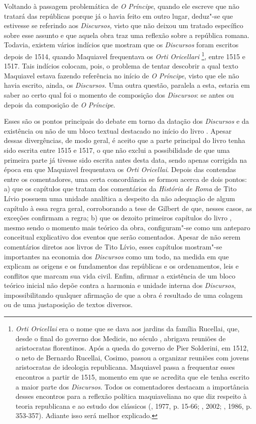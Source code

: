 Voltando à passagem problemática de \emph{O Príncipe}, quando ele
escreve que não tratará das repúblicas porque já o havia feito em outro
lugar, deduz"-se que estivesse se referindo aos \emph{Discursos,} visto
que não deixou um tratado específico sobre esse assunto e que aquela
obra traz uma reflexão sobre a república romana. Todavia, existem vários
indícios que mostram que os \emph{Discursos} foram escritos depois de
1514, quando Maquiavel frequentava os \emph{Orti Oricellari} \footnote{\emph{Orti
  Oricellai} era o nome que se dava aos jardins da família Rucellai,
  que, desde o final do governo dos Medicis, no século , abrigava
  reuniões de aristocratas florentinos. Após a queda do governo de Pier
  Solderini, em 1512, o neto de Bernardo Rucellai, Cosimo, passou a
  organizar reuniões com jovens aristocratas de ideologia republicana.
  Maquiavel passa a frequentar esses encontros a partir de 1515, momento
  em que se acredita que ele tenha escrito a maior parte dos
  \emph{Discursos}. Todos os comentadores destacam a importância desses
  encontros para a reflexão política maquiaveliana no que diz respeito à
  teoria republicana e ao estudo dos clássicos (, 1977, p. 15-66;
  , 2002; , 1986, p. 353-357). Adiante isso será melhor
  explicado.}, entre 1515 e 1517. Tais indícios colocam, pois, o
problema de tentar descobrir a qual texto Maquiavel estava fazendo
referência no início de \emph{O Príncipe}, visto que ele não
havia escrito, ainda, os \emph{Discursos.} Uma outra questão, paralela a
esta, estaria em saber ao certo qual foi o momento de composição dos
\emph{Discursos}: se antes ou depois da composição de \emph{O}
\emph{Príncipe}.

Esses são os pontos principais do debate em torno da datação dos
\emph{Discursos} e da existência ou não de um bloco textual destacado no
início do livro . Apesar dessas divergências, de modo geral, é aceito
que a parte principal do livro tenha sido escrita entre 1515 e 1517, o
que não exclui a possibilidade de que uma primeira parte já tivesse sido
escrita antes desta data, sendo apenas corrigida na época em que
Maquiavel frequentava os \emph{Orti Oricellai}. Depois das contendas
entre os comentadores, uma certa concordância se formou acerca de dois
pontos: a) que os capítulos que tratam dos comentários da \emph{História
de Roma} de Tito Lívio possuem uma unidade analítica a despeito da não
adequação de algum capítulo à essa regra geral, corroborando a tese de
Gilbert de que, nesses casos, as exceções confirmam a regra; b) que os
dezoito primeiros capítulos do livro , mesmo sendo o momento mais
teórico da obra, configuram"-se como um anteparo conceitual explicativo
dos eventos que serão comentados. Apesar de não serem comentários
diretos aos livros de Tito Lívio, esses capítulos mostram"-se importantes
na economia dos \emph{Discursos} como um todo, na medida em que explicam
as origens e os fundamentos das repúblicas e os ordenamentos, leis e
conflitos que marcam sua vida civil. Enfim, afirmar a existência de um
bloco teórico inicial não depõe contra a harmonia e unidade interna dos
\emph{Discursos}, impossibilitando qualquer afirmação de que a obra é
resultado de uma colagem ou de uma justaposição de textos diversos.

